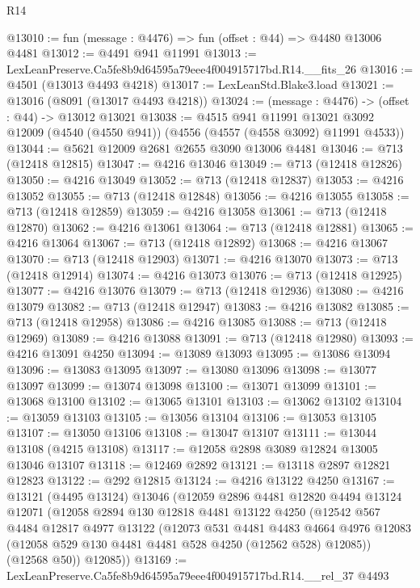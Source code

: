 \begin{lexlean}{R14}
\begin{coremodule}
@13010 := fun (message : @4476) => fun (offset : @44) => @4480 @13006 @4481
@13012 := @4491 @941 @11991
@13013 := LexLeanPreserve.Ca5fe8b9d64595a79eee4f004915717bd.R14.__fits_26
@13016 := @4501 (@13013 @4493 @4218)
@13017 := LexLeanStd.Blake3.load
@13021 := @13016 (@8091 (@13017 @4493 @4218))
@13024 := (message : @4476) -> (offset : @44) -> @13012 @13021
@13038 := @4515
    @941
    @11991
    @13021
    @3092
    @12009
    (@4540 (@4550 @941))
    (@4556 (@4557 (@4558 @3092) @11991 @4533))
@13044 := @5621 @12009 @2681 @2655 @3090 @13006 @4481
@13046 := @713 (@12418 @12815)
@13047 := @4216 @13046
@13049 := @713 (@12418 @12826)
@13050 := @4216 @13049
@13052 := @713 (@12418 @12837)
@13053 := @4216 @13052
@13055 := @713 (@12418 @12848)
@13056 := @4216 @13055
@13058 := @713 (@12418 @12859)
@13059 := @4216 @13058
@13061 := @713 (@12418 @12870)
@13062 := @4216 @13061
@13064 := @713 (@12418 @12881)
@13065 := @4216 @13064
@13067 := @713 (@12418 @12892)
@13068 := @4216 @13067
@13070 := @713 (@12418 @12903)
@13071 := @4216 @13070
@13073 := @713 (@12418 @12914)
@13074 := @4216 @13073
@13076 := @713 (@12418 @12925)
@13077 := @4216 @13076
@13079 := @713 (@12418 @12936)
@13080 := @4216 @13079
@13082 := @713 (@12418 @12947)
@13083 := @4216 @13082
@13085 := @713 (@12418 @12958)
@13086 := @4216 @13085
@13088 := @713 (@12418 @12969)
@13089 := @4216 @13088
@13091 := @713 (@12418 @12980)
@13093 := @4216 @13091 @4250
@13094 := @13089 @13093
@13095 := @13086 @13094
@13096 := @13083 @13095
@13097 := @13080 @13096
@13098 := @13077 @13097
@13099 := @13074 @13098
@13100 := @13071 @13099
@13101 := @13068 @13100
@13102 := @13065 @13101
@13103 := @13062 @13102
@13104 := @13059 @13103
@13105 := @13056 @13104
@13106 := @13053 @13105
@13107 := @13050 @13106
@13108 := @13047 @13107
@13111 := @13044 @13108 (@4215 @13108)
@13117 := @12058 @2898 @3089 @12824 @13005 @13046 @13107
@13118 := @12469 @2892
@13121 := @13118 @2897 @12821 @12823
@13122 := @292 @12815
@13124 := @4216 @13122 @4250
@13167 := @13121
    (@4495 @13124)
    @13046
    (@12059
      @2896
      @4481
      @12820
      @4494
      @13124
      @12071
      (@12058
        @2894
        @130
        @12818
        @4481
        @13122
        @4250
        (@12542
          @567
          @4484
          @12817
          @4977
          @13122
          (@12073
            @531
            @4481
            @4483
            @4664
            @4976
            @12083
            (@12058 @529 @130 @4481 @4481 @528 @4250 (@12562 @528) @12085))
          (@12568 @50))
        @12085))
@13169 := LexLeanPreserve.Ca5fe8b9d64595a79eee4f004915717bd.R14.__rel_37 @4493

\end{coremodule}
\end{lexlean}
